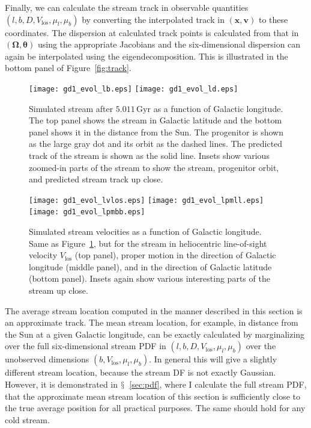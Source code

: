 \documentclass[12pt,preprint]{aastex}
\renewcommand{\figurename}{Figure}
\newcommand{\sectionname}{$\mathsection$}
\renewcommand{\vec}[1]{\ensuremath{\mathbf{#1}}}
\newcommand{\vecx}{\ensuremath{\vec{x}}}
\newcommand{\vecv}{\ensuremath{\vec{v}}}
\newcommand{\veco}{\ensuremath{\vec{\Omega}}}
\newcommand{\veca}{\ensuremath{\boldsymbol\theta}}
\newcommand{\Gyr}{\ensuremath{\,\mathrm{Gyr}}}
\newcommand{\vlos}{\ensuremath{V_{\mathrm{los}}}}
\newcommand{\pmll}{\ensuremath{\mu_l}}
\newcommand{\pmbb}{\ensuremath{\mu_b}}
\begin{document}
Finally, we can calculate the stream track in observable quantities
$(l,b,D,\vlos,\pmll,\pmbb)$ by converting the interpolated track in
$(\vecx,\vecv)$ to these coordinates. The dispersion at calculated
track points is calculated from that in $(\veco,\veca)$ using the
appropriate Jacobians and the six-dimensional dispersion can again be
interpolated using the eigendecomposition. This is illustrated in the
bottom panel of \figurename~\ref{fig:track}.

\begin{figure}[t!]
  \texttt{[image: gd1\_evol\_lb.eps]}
  \texttt{[image: gd1\_evol\_ld.eps]}
  \caption{Simulated stream after $5.011\Gyr$ as a function of
    Galactic longitude. The top panel shows the stream in Galactic
    latitude and the bottom panel shows it in the distance from the
    Sun. The progenitor is shown as the large gray dot and its orbit
    as the dashed lines. The predicted track of the stream is shown as
    the solid line. Insets show various zoomed-in parts of the stream
    to show the stream, progenitor orbit, and predicted stream track
    up close.}\label{fig:gd1_lbd}
\end{figure}

\begin{figure}[tp!!]
  \texttt{[image: gd1\_evol\_lvlos.eps]}
  \texttt{[image: gd1\_evol\_lpmll.eps]}
  \texttt{[image: gd1\_evol\_lpmbb.eps]}
  \caption{Simulated stream velocities as a function of Galactic
    longitude. Same as \figurename~\ref{fig:gd1_lbd}, but for the
    stream in heliocentric line-of-sight velocity $V_{\mathrm{los}}$
    (top panel), proper motion in the direction of Galactic longitude
    (middle panel), and in the direction of Galactic latitude (bottom
    panel). Insets again show various interesting parts of the stream
    up close.}\label{fig:gd1_lbv}
\end{figure}

The average stream location computed in the manner described in this
section is an approximate track. The mean stream location, for
example, in distance from the Sun at a given Galactic longitude, can
be exactly calculated by marginalizing over the full six-dimensional
stream PDF in $(l,b,D,\vlos,\pmll,\pmbb)$ over the unobserved
dimensions $(b,\vlos,\pmll,\pmbb)$. In general this will give a
slightly different stream location, because the stream DF is not
exactly Gaussian. However, it is demonstrated in
\sectionname~\ref{sec:pdf}, where I calculate the full stream PDF,
that the approximate mean stream location of this section is
sufficiently close to the true average position for all practical
purposes. The same should hold for any cold stream.
\end{document}
